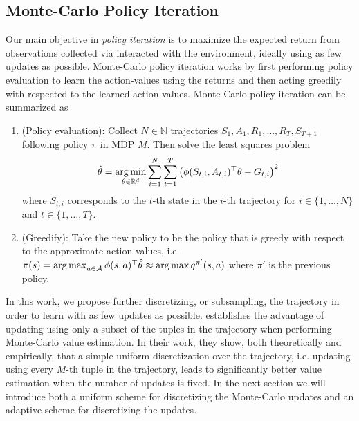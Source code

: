 \subsection{Monte-Carlo Policy Iteration} Our main objective in \textit{policy iteration} is to maximize the expected return from observations collected via interacted with the environment, ideally using as few updates as possible. Monte-Carlo policy iteration works by first performing policy evaluation to learn the action-values using the returns and then acting greedily with respected to the learned action-values. Monte-Carlo policy iteration can be summarized as 
\begin{enumerate}
    \item (Policy evaluation): Collect $N \in \mathbb{N}$ trajectories $S_{1},A_1,R_1,\dotsc,R_T,S_{T+1}$ following policy $\pi$ in MDP $M$. Then solve the least squares problem 
    \begin{align*}
        \hat\theta = \mathop{\rm arg\,min}_{\theta \in \mathbb{R}^d} \sum_{i=1}^N\sum_{t=1}^T \left(\phi(S_{t,i},A_{t,i})^\top \theta - G_{t,i}\right)^2
    \end{align*}
    where $S_{t,i}$ corresponds to the $t$-th state in the $i$-th trajectory for $i \in \{1,\dotsc,N\}$ and $t \in \{1,\dotsc,T\}$.
    \item (Greedify): Take the new policy to be the policy that is greedy with respect to the approximate action-values, i.e. $\pi(s) = \mathop{\rm arg\,max}_{a \in \mathcal{A}} \phi(s,a)^\top \hat\theta \approx \mathop{\rm arg\,max} q^{\pi'}(s,a)$ where $\pi'$ is the previous policy.
\end{enumerate}
In this work, we propose further discretizing, or subsampling, the trajectory in order to learn with as few updates as possible. \cite{zhang2024managing} establishes the advantage of updating using only a subset of the tuples in the trajectory when performing Monte-Carlo value estimation. In their work, they show, both theoretically and empirically, that a simple uniform discretization over the trajectory, i.e. updating using every $M$-th tuple in the trajectory, leads to significantly better value estimation when the number of updates is fixed. In the next section we will introduce both a uniform scheme for discretizing the Monte-Carlo updates and an adaptive scheme for discretizing the updates.



